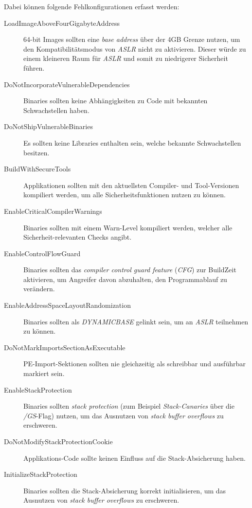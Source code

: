 Dabei können folgende Fehlkonfigurationen erfasst werden:
\begin{description}
	\item[LoadImageAboveFourGigabyteAddress] 64-bit Images sollten eine \textit{base address} über der 4GB Grenze nutzen, um den Kompatibilitätsmodus von \textit{ASLR} nicht zu aktivieren. Dieser würde zu einem kleineren Raum für \textit{ASLR} und somit zu niedrigerer Sicherheit führen.
	
	\item[DoNotIncorporateVulnerableDependencies] Binaries sollten keine Abhängigkeiten zu Code mit bekannten Schwachstellen haben.
	
	\item[DoNotShipVulnerableBinaries] Es sollten keine Libraries enthalten sein, welche bekannte Schwachstellen besitzen.
	
	\item[BuildWithSecureTools] Applikationen sollten mit den aktuellsten Compiler- und Tool-Versionen kompiliert werden, um alle Sicherheitsfunktionen nutzen zu können.
	
	\item[EnableCriticalCompilerWarnings] Binaries sollten mit einem Warn-Level kompiliert werden, welcher alle Sicherheit-relevanten Checks angibt.
	
	\item[EnableControlFlowGuard] Binaries sollten das \textit{compiler control guard feature} (\textit{CFG}) zur BuildZeit aktivieren, um Angreifer davon abzuhalten, den Programmablauf zu verändern.
	
	\item[EnableAddressSpaceLayoutRandomization] Binaries sollten als \textit{DYNAMICBASE} gelinkt sein, um an \textit{ASLR} teilnehmen zu können.
	
	\item[DoNotMarkImportsSectionAsExecutable] PE-Import-Sektionen sollten nie gleichzeitig als schreibbar und ausführbar markiert sein.
	
	\item[EnableStackProtection] Binaries sollten \textit{stack protection} (zum Beispiel \textit{Stack-Canaries} über die \textit{/GS}-Flag) nutzen, um das Ausnutzen von \textit{stack buffer overflows} zu erschweren.
	
	\item[DoNotModifyStackProtectionCookie] Applikations-Code sollte keinen Einfluss auf die Stack-Absicherung haben.
	
	\item[InitializeStackProtection] Binaries sollten die Stack-Absicherung korrekt initialisieren, um das Ausnutzen von \textit{stack buffer overflows} zu erschweren.
	

\end{description}
